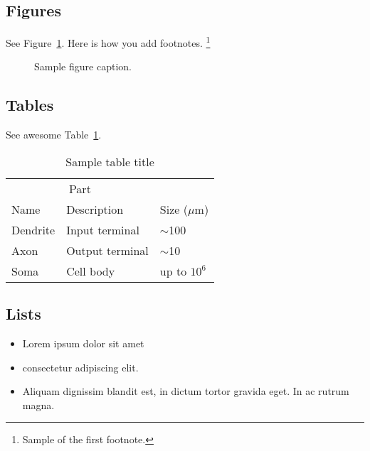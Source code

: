 \subsection{Figures}
\lipsum[10]
See Figure~\ref{fig:fig1}.
Here is how you add footnotes. \footnote{Sample of the first footnote.}
\lipsum[11]

\begin{figure}
    \centering
    \fbox{\rule[-.5cm]{4cm}{4cm} \rule[-.5cm]{4cm}{0cm}}
    \caption{Sample figure caption.}
    \label{fig:fig1}
\end{figure}

\subsection{Tables}
\lipsum[12]
See awesome Table~\ref{tab:table}.

\begin{table}
    \caption{Sample table title}
    \centering
    \begin{tabular}{lll}
        \toprule
        \multicolumn{2}{c}{Part} \\
        \cmidrule(r){1-2}
        Name     & Description     & Size ($\mu$m) \\
        \midrule
        Dendrite & Input terminal  & $\sim$100     \\
        Axon     & Output terminal & $\sim$10      \\
        Soma     & Cell body       & up to $10^6$  \\
        \bottomrule
    \end{tabular}
    \label{tab:table}
\end{table}

\subsection{Lists}
\begin{itemize}
    \item Lorem ipsum dolor sit amet
    \item consectetur adipiscing elit.
    \item Aliquam dignissim blandit est, in dictum tortor gravida eget.
    In ac rutrum magna.
\end{itemize}
